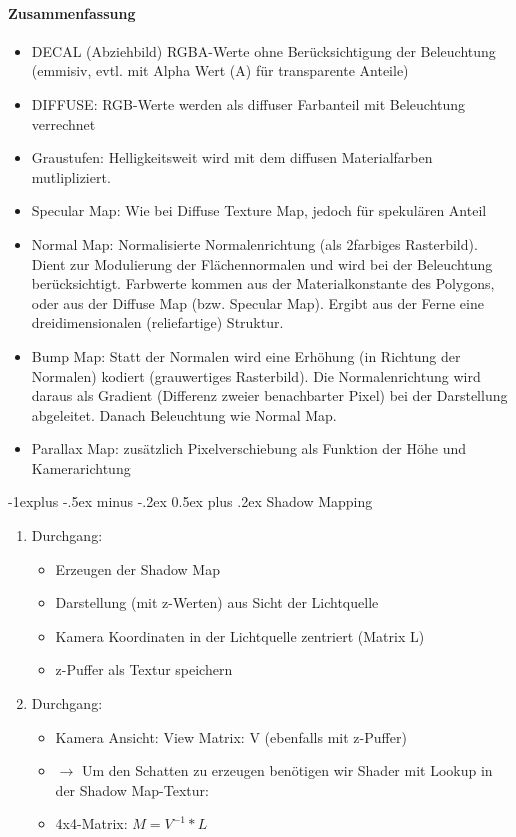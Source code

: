 \documentclass[10pt,landscape]{article}
\makeatletter
\renewcommand{\subsection}{\@startsection{subsection}{2}{0mm}%
                                {-1explus -.5ex minus -.2ex}%
                                {0.5ex plus .2ex}%
                                {\normalfont\normalsize\bfseries}}
\makeatother
\begin{document}
\begin{multicols}{3}
\paragraph{Zusammenfassung}
\begin{itemize}
  \item DECAL (Abziehbild) RGBA-Werte ohne Berücksichtigung der Beleuchtung (emmisiv, evtl. mit Alpha Wert (A) für transparente Anteile)
  \item DIFFUSE: RGB-Werte werden als diffuser Farbanteil mit Beleuchtung verrechnet
  \item Graustufen: Helligkeitsweit wird mit dem diffusen Materialfarben mutlipliziert.
  \item Specular Map: Wie bei Diffuse Texture Map, jedoch für spekulären Anteil
  \item Normal Map: Normalisierte Normalenrichtung (als 2farbiges Rasterbild). Dient zur Modulierung der Flächennormalen und wird bei der Beleuchtung berücksichtigt. Farbwerte kommen aus der Materialkonstante des Polygons, oder aus der Diffuse Map (bzw. Specular Map). Ergibt aus der Ferne eine dreidimensionalen (reliefartige) Struktur.
  \item Bump Map: Statt der Normalen wird eine Erhöhung (in Richtung der Normalen) kodiert (grauwertiges Rasterbild). Die Normalenrichtung wird daraus als Gradient (Differenz zweier benachbarter Pixel) bei der Darstellung abgeleitet. Danach Beleuchtung wie Normal Map.
  \item Parallax Map: zusätzlich Pixelverschiebung als Funktion der Höhe und Kamerarichtung
\end{itemize}

\subsection{ Shadow Mapping}
\begin{enumerate}
  \item Durchgang:
        \begin{itemize} 
          \item Erzeugen der Shadow Map
          \item Darstellung (mit z-Werten) aus Sicht der Lichtquelle
          \item Kamera Koordinaten in der Lichtquelle zentriert (Matrix L)
          \item z-Puffer als Textur speichern
        \end{itemize}
  \item Durchgang:
        \begin{itemize}
          \item Kamera Ansicht: View Matrix: V (ebenfalls mit z-Puffer)
          \item $\rightarrow$ Um den Schatten zu erzeugen benötigen wir Shader mit Lookup in der Shadow Map-Textur:
          \item 4x4-Matrix: $M = V^{-1}*L$
        \end{itemize}
\end{enumerate}


\end{multicols}
\end{document}
